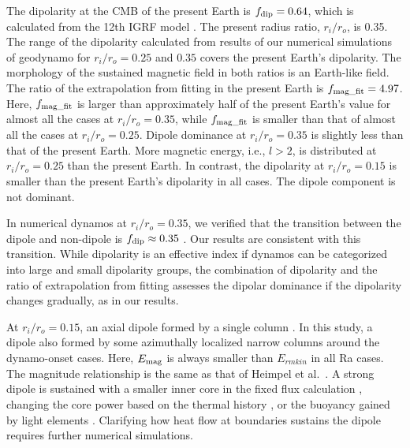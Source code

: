 The dipolarity at the CMB of the present Earth is $f_{\rm dip} = 0.64$, which is calculated from the 12th IGRF model \cite{Thebault:2015}. 
The present radius ratio, $r_i/r_o$, is 0.35. 
The range of the dipolarity calculated from results of our numerical simulations of geodynamo for $r_i/r_o  = 0.25$ and $0.35$ covers the present Earth's dipolarity. 
The morphology of the sustained magnetic field in both ratios is an Earth-like field. 
The ratio of the extrapolation from fitting in the present Earth is $f_{\rm mag\_fit} = 4.97$. 
Here, $f_{\rm mag\_fit}$ is larger than approximately half of the present Earth's value for almost all the cases at $r_i/r_o = 0.35$, while $f_{\rm mag\_fit}$ is smaller than that of almost all the cases at $r_i/r_o = 0.25$. 
Dipole dominance at $r_i/r_o = 0.35$ is slightly less than that of the present Earth. 
More magnetic energy, i.e., $l > 2$, is distributed at $r_i/r_o = 0.25$ than the present Earth. 
In contrast, the dipolarity at $r_i/r_o = 0.15$ is smaller than the present Earth's dipolarity in all cases. 
The dipole component is not dominant.

In numerical dynamos at $r_i/r_o = 0.35$, we verified that the transition between the dipole and non-dipole is $f_{\rm dip} \approx 0.35$ \cite{Uli:2006,Olson:2011}.
Our results are consistent with this transition. 
While dipolarity is an effective index if dynamos can be categorized into large and small dipolarity groups, the combination of dipolarity and the ratio of extrapolation from fitting assesses the dipolar dominance if the dipolarity changes gradually, as in our results.

At $r_i/r_o =0.15$, an axial dipole formed by a single column \cite{Heimpel:2005}. 
In this study, a dipole also formed by some azimuthally localized narrow columns around the dynamo-onset cases. 
Here, $E_{\rm mag}$ is always smaller than $E_{rm kin}$ in all Ra cases. 
The magnitude relationship is the same as that of Heimpel et al.\ . 
A strong dipole is sustained with a smaller inner core in the fixed flux calculation \cite{Hori:2010}, changing the core power based on the thermal history \cite{Driscoll:2016}, or the buoyancy gained by light elements \cite{Lhuillier:2019}.
Clarifying how heat flow at boundaries sustains the dipole requires further numerical simulations.

